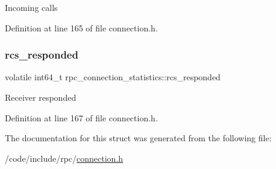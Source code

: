 Incoming calls 

Definition at line 165 of file connection.\+h.

\mbox{\label{structrpc__connection__statistics_a9c9cd982c4e9c548175e11e5a6a19401}} 
\subsubsection{\texorpdfstring{rcs\+\_\+responded}{rcs\_responded}}
{\footnotesize\ttfamily volatile int64\+\_\+t rpc\+\_\+connection\+\_\+statistics\+::rcs\+\_\+responded}

Receiver responded 

Definition at line 167 of file connection.\+h.



The documentation for this struct was generated from the following file\+:\begin{DoxyCompactItemize}
\item 
/code/include/rpc/\hyperlink{connection_8h}{connection.\+h}\end{DoxyCompactItemize}
